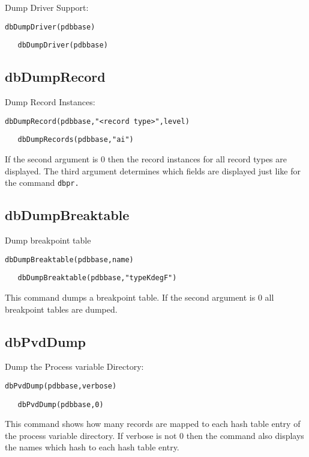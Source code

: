 Dump Driver Support:

\begin{verbatim}dbDumpDriver(pdbbase)
\end{verbatim}

\begin{verbatim}   dbDumpDriver(pdbbase)
\end{verbatim}\subsection{dbDumpRecord}

Dump Record Instances:

\begin{verbatim}dbDumpRecord(pdbbase,"<record type>",level)
\end{verbatim}

\begin{verbatim}   dbDumpRecords(pdbbase,"ai")
\end{verbatim}If the second argument is 0 then the record instances for all record types are displayed. The third argument determines 
which fields are displayed just like for the command \verb|dbpr.|

\subsection{dbDumpBreaktable}

Dump breakpoint table

\begin{verbatim}dbDumpBreaktable(pdbbase,name)
\end{verbatim}

\begin{verbatim}   dbDumpBreaktable(pdbbase,"typeKdegF")
\end{verbatim}This command dumps a breakpoint table. If the second argument is 0 all breakpoint tables are dumped.

\subsection{dbPvdDump}

Dump the Process variable Directory:

\begin{verbatim}dbPvdDump(pdbbase,verbose)
\end{verbatim}

\begin{verbatim}   dbPvdDump(pdbbase,0)
\end{verbatim}This command shows how many records are mapped to each hash table entry of the process variable directory. If verbose 
is not 0 then the command also displays the names which hash to each hash table entry.




